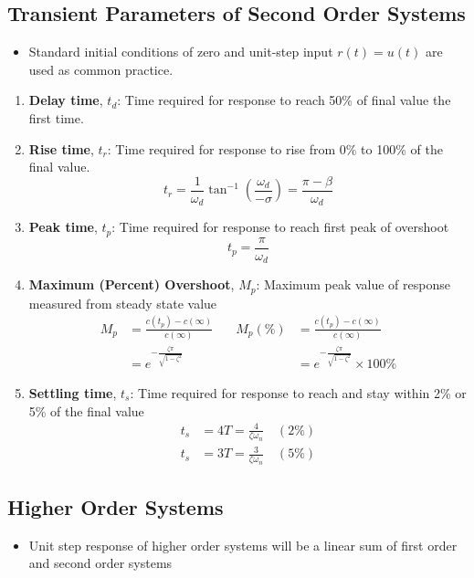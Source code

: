 \documentclass[a4paper]{article}
\begin{document}
\subsection{Transient Parameters of Second Order Systems}
\begin{itemize}
    \item Standard initial conditions of zero and unit-step input $r(t) = u(t)$ are used as common practice.
\end{itemize}
\begin{enumerate}
    \item \textbf{Delay time}, $t_d$: Time required for response to reach 50\% of final value the first time.
    \item \textbf{Rise time}, $t_r$: Time required for response to rise from 0\% to 100\% of the final value.
    $$t_r = \frac{1}{\omega_d}\tan^{-1}\left(\frac{\omega_d}{-\sigma}\right) = \frac{\pi-\beta}{\omega_d}$$
    \item \textbf{Peak time}, $t_p$: Time required for response to reach first peak of overshoot
    $$t_p = \frac{\pi}{\omega_d}$$
    \item \textbf{Maximum (Percent) Overshoot}, $M_p$: Maximum peak value of response measured from steady state value
    \begin{align*}
        M_p &= \frac{c(t_p)-c(\infty)}{c(\infty)}\quad &M_p(\%)&= \frac{c(t_p)-c(\infty)}{c(\infty)}\\
        &= e^{-\displaystyle\frac{\zeta\pi}{\sqrt{1-\zeta^2}}}\quad&&= e^{-\displaystyle\frac{\zeta\pi}{\sqrt{1-\zeta^2}}}\times100\%
    \end{align*}
    \item \textbf{Settling time}, $t_s$: Time required for response to reach and stay within 2\% or 5\% of the final value
    \begin{align*}
        t_s &= 4T = \frac{4}{\zeta\omega_n}\quad (2\%)\\
        t_s &= 3T = \frac{3}{\zeta\omega_n}\quad (5\%)
    \end{align*}
\end{enumerate}

\subsection{Higher Order Systems}
\begin{itemize}
    \item Unit step response of higher order systems will be a linear sum of first order and second order systems
\end{itemize}
\end{document}
